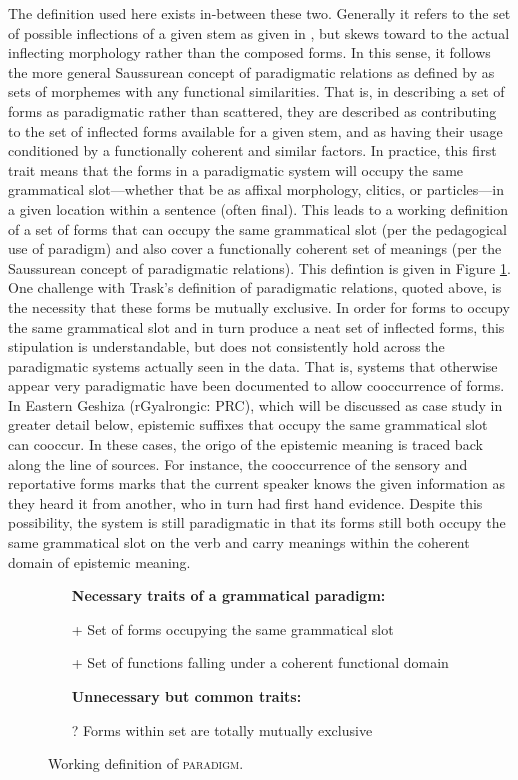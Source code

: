 The definition used here exists in-between these two. Generally it refers to the set of possible inflections of a given stem as given in , but skews toward to the actual inflecting morphology rather than the composed forms. In this sense, it follows the more general Saussurean concept of paradigmatic relations as defined by  as sets of morphemes with any functional similarities. That is, in describing a set of forms as paradigmatic rather than scattered, they are described as contributing to the set of inflected forms available for a given stem, and as having their usage conditioned by a functionally coherent and similar factors. In practice, this first trait means that the forms in a paradigmatic system will occupy the same grammatical slot---whether that be as affixal morphology, clitics, or particles---in a given location within a sentence (often final). This leads to a working definition of a set of forms that can occupy the same grammatical slot (per the pedagogical use of paradigm) and also cover a functionally coherent set of meanings (per the Saussurean concept of paradigmatic relations). This defintion is given in Figure \ref{f:Discussion:Paradigm}. One challenge with Trask's definition of paradigmatic relations, quoted above, is the necessity that these forms be mutually exclusive. In order for forms to occupy the same grammatical slot and in turn produce a neat set of inflected forms, this stipulation is understandable, but does not consistently hold across the paradigmatic systems actually seen in the data. That is, systems that otherwise appear very paradigmatic have been documented to allow cooccurrence of forms. In Eastern Geshiza (rGyalrongic: PRC), which will be discussed as case study in greater detail below, epistemic suffixes that occupy the same grammatical slot can cooccur. In these cases, the origo of the epistemic meaning is traced back along the line of sources. For instance, the cooccurrence of the sensory and reportative forms marks that the current speaker knows the given information as they heard it from another, who in turn had first hand evidence. Despite this possibility, the system is still paradigmatic in that its forms still both occupy the same grammatical slot on the verb and carry meanings within the coherent domain of epistemic meaning.

\begin{figure}
    \begin{itemize}
        \item[] \textbf{Necessary traits of a grammatical paradigm:}
        \item[+] Set of forms occupying the same grammatical slot
        \item[+] Set of functions falling under a coherent functional domain
        \item[] \textbf{Unnecessary but common traits:}
        \item[?] Forms within set are totally mutually exclusive
    \end{itemize}
    \caption{Working definition of \textsc{paradigm}.}\label{f:Discussion:Paradigm}
\end{figure}

